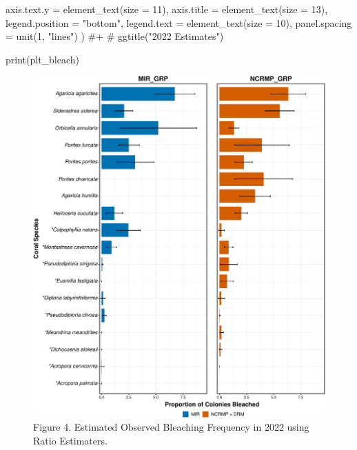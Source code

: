 \documentclass[
]{article}
\newenvironment{Shaded}{\begin{snugshade}}{\end{snugshade}}
\newcommand{\AttributeTok}[1]{\textcolor[rgb]{0.40,0.45,0.13}{#1}}
\newcommand{\CommentTok}[1]{\textcolor[rgb]{0.37,0.37,0.37}{#1}}
\newcommand{\DecValTok}[1]{\textcolor[rgb]{0.68,0.00,0.00}{#1}}
\newcommand{\FunctionTok}[1]{\textcolor[rgb]{0.28,0.35,0.67}{#1}}
\newcommand{\NormalTok}[1]{\textcolor[rgb]{0.00,0.23,0.31}{#1}}
\newcommand{\StringTok}[1]{\textcolor[rgb]{0.13,0.47,0.30}{#1}}
\begin{document}
\begin{Shaded}
\begin{Highlighting}[]
          \AttributeTok{axis.text.y =} \FunctionTok{element\_text}\NormalTok{(}\AttributeTok{size =} \DecValTok{11}\NormalTok{),}
          \AttributeTok{axis.title =} \FunctionTok{element\_text}\NormalTok{(}\AttributeTok{size =} \DecValTok{13}\NormalTok{),}
          \AttributeTok{legend.position =} \StringTok{"bottom"}\NormalTok{,}
          \AttributeTok{legend.text =} \FunctionTok{element\_text}\NormalTok{(}\AttributeTok{size =} \DecValTok{10}\NormalTok{),}
          \AttributeTok{panel.spacing =} \FunctionTok{unit}\NormalTok{(}\DecValTok{1}\NormalTok{, }\StringTok{"lines"}\NormalTok{)}
\NormalTok{        ) }\CommentTok{\#+}
 \CommentTok{\# ggtitle("2022 Estimates")}


\FunctionTok{print}\NormalTok{(plt\_bleach)}
\end{Highlighting}
\end{Shaded}

\begin{figure}[H]

{\centering \includegraphics{MIR_quarto_files/figure-pdf/bleach 2022-1.pdf}

}

\caption{Figure 4. Estimated Observed Bleaching Frequency in 2022 using
Ratio Estimaters.}

\end{figure}
\end{document}
